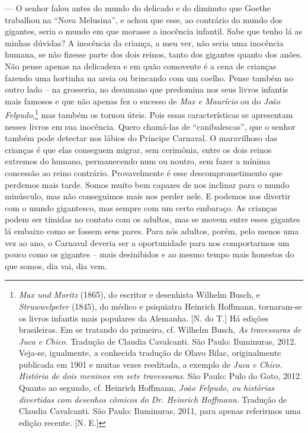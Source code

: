 --- O senhor falou antes do mundo do delicado e do diminuto que Goethe
trabalhou na ``Nova Melusina'', e achou que esse, ao contrário do mundo
dos gigantes, seria o mundo em que morasse a inocência infantil. Sabe
que tenho lá as minhas dúvidas? A inocência da criança, a meu ver, não
seria uma inocência humana, se não fizesse parte dos dois reinos, tanto
dos gigantes quanto dos anões. Não pense apenas na delicadeza e em quão
comovente é a cena de crianças fazendo uma hortinha na areia ou
brincando com um coelho. Pense também no outro lado -- na grosseria, no
desumano que predomina nos seus livros infantis mais famosos e que não
apenas fez o sucesso de \emph{Max e Maurício} ou do \emph{João
Felpudo},\footnote{\emph{Max und Moritz} (1865), do escritor e
  desenhista Wilhelm Busch, e \emph{Struwwelpeter} (1845), do médico e
  psiquiatra Heinrich Hoffmann, tornaram-se os livros infantis mais
  populares da Alemanha. [N. do T.] Há edições brasileiras. Em se
  tratando do primeiro, cf. Wilhelm Busch, \emph{As travessuras de Juca
  e Chico}. Tradução de Claudia Cavalcanti. São Paulo: Iluminuras, 2012.
  Veja-se, igualmente, a conhecida tradução de Olavo Bilac,
  originalmente publicada em 1901 e muitas vezes reeditada, a exemplo de
  \emph{Juca e Chico. História de dois meninos em sete travessuras}. São
  Paulo: Pulo do Gato, 2012. Quanto ao segundo, cf. Heinrich Hoffmann,
  \emph{João Felpudo, ou histórias divertidas com desenhos cômicos do
  Dr. Heinrich Hoffmann}. Tradução de Claudia Cavalcanti. São Paulo:
  Iluminuras, 2011, para apenas referirmos uma edição recente. [N.
  E.]} mas também os tornou úteis. Pois essas características se
apresentam nesses livros em sua inocência. Quero chamá-las de
``canibalescas'', que o senhor também pode detectar nos lábios do
Príncipe Carnaval. O maravilhoso das crianças é que elas conseguem
migrar, sem cerimônia, entre os dois reinos extremos do humano,
permanecendo num ou noutro, sem fazer a mínima concessão ao reino
contrário. Provavelmente é esse descomprometimento que perdemos mais
tarde. Somos muito bem capazes de nos inclinar para o mundo minúsculo,
mas não conseguimos mais nos perder nele. E podemos nos divertir com o
mundo gigantesco, mas sempre com um certo embaraço. As crianças podem
ser tímidas no contato com os adultos, mas se movem entre esses gigantes
lá embaixo como se fossem seus pares. Para nós adultos, porém, pelo
menos uma vez ao ano, o Carnaval deveria ser a oportunidade para nos
comportarmos um pouco como os gigantes -- mais desinibidos e ao mesmo
tempo mais honestos do que somos, dia vai, dia vem.

